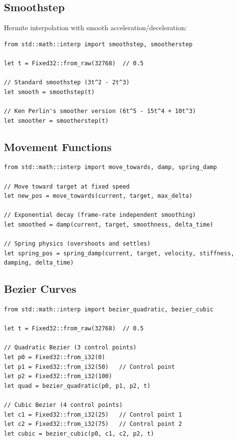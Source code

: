 \subsection{Smoothstep}

Hermite interpolation with smooth acceleration/deceleration:

\begin{lstlisting}
from std::math::interp import smoothstep, smootherstep

let t = Fixed32::from_raw(32768)  // 0.5

// Standard smoothstep (3t^2 - 2t^3)
let smooth = smoothstep(t)

// Ken Perlin's smoother version (6t^5 - 15t^4 + 10t^3)
let smoother = smootherstep(t)
\end{lstlisting}

\subsection{Movement Functions}

\begin{lstlisting}
from std::math::interp import move_towards, damp, spring_damp

// Move toward target at fixed speed
let new_pos = move_towards(current, target, max_delta)

// Exponential decay (frame-rate independent smoothing)
let smoothed = damp(current, target, smoothness, delta_time)

// Spring physics (overshoots and settles)
let spring_pos = spring_damp(current, target, velocity, stiffness, damping, delta_time)
\end{lstlisting}

\subsection{Bezier Curves}

\begin{lstlisting}
from std::math::interp import bezier_quadratic, bezier_cubic

let t = Fixed32::from_raw(32768)  // 0.5

// Quadratic Bezier (3 control points)
let p0 = Fixed32::from_i32(0)
let p1 = Fixed32::from_i32(50)   // Control point
let p2 = Fixed32::from_i32(100)
let quad = bezier_quadratic(p0, p1, p2, t)

// Cubic Bezier (4 control points)
let c1 = Fixed32::from_i32(25)   // Control point 1
let c2 = Fixed32::from_i32(75)   // Control point 2
let cubic = bezier_cubic(p0, c1, c2, p2, t)
\end{lstlisting}

